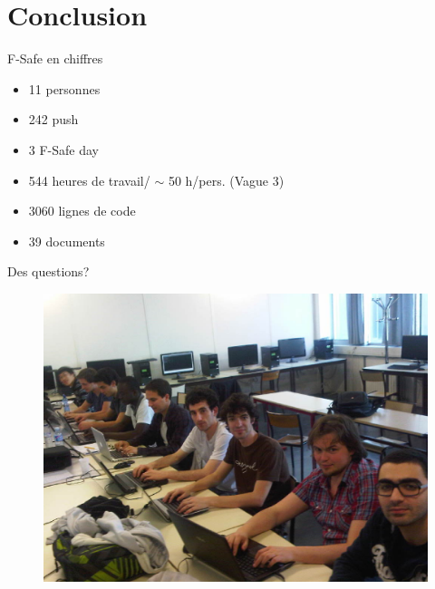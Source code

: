 \section{Conclusion}
\begin{frame}{F-Safe en chiffres}
  \begin{block}{}
    \begin{itemize}
      \item 11 personnes
      \item 242 push
      \item 3 F-Safe day
      \item 544 heures de travail/ $\sim$ 50 h/pers.  (Vague 3)
      \item 3060 lignes de code
      \item 39 documents
    \end{itemize}
  \end{block}
\end{frame}

\begin{frame}{Des questions?}
  \begin{center}
   \begin{figure}
    \includegraphics[scale=0.25]{img/des_questions.jpg}
   \end{figure} 
  \end{center}
\end{frame}
